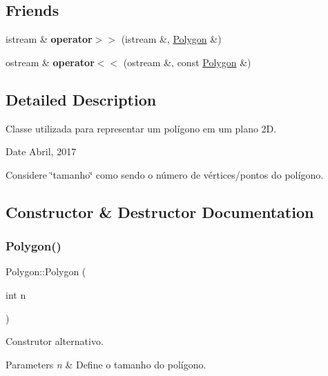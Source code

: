 \subsection*{Friends}
\begin{DoxyCompactItemize}
\item 
\mbox{\label{class_polygon_a81a0d6063bf43c894c4a3da261f66c9c}} 
istream \& {\bfseries operator$>$$>$} (istream \&, \hyperlink{class_polygon}{Polygon} \&)
\item 
\mbox{\label{class_polygon_a78b2987525d6996d71480891f6402f3d}} 
ostream \& {\bfseries operator$<$$<$} (ostream \&, const \hyperlink{class_polygon}{Polygon} \&)
\end{DoxyCompactItemize}


\subsection{Detailed Description}
Classe utilizada para representar um polígono em um plano 2D. 

\begin{DoxyDate}{Date}
Abril, 2017
\end{DoxyDate}
Considere \char`\"{}tamanho\char`\"{} como sendo o número de vértices/pontos do polígono. 

\subsection{Constructor \& Destructor Documentation}
\mbox{\label{class_polygon_af7bc02fdd1541b49aa3f8e2006a30aad}} 
\subsubsection{\texorpdfstring{Polygon()}{Polygon()}}
{\footnotesize\ttfamily Polygon\+::\+Polygon (\begin{DoxyParamCaption}\item[{int}]{n }\end{DoxyParamCaption})}



Construtor alternativo. 


\begin{DoxyParams}{Parameters}
{\em n} & Define o tamanho do polígono. \\
\hline
\end{DoxyParams}


